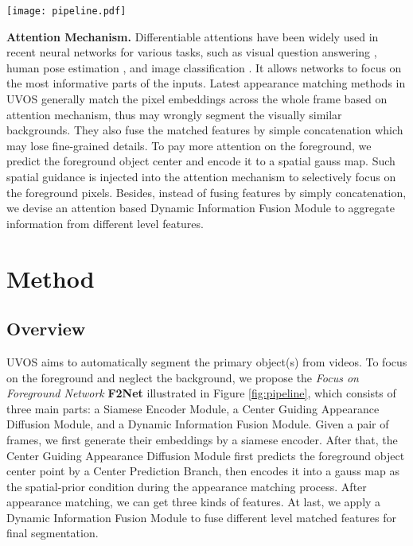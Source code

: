 \documentclass[letterpaper]{article} \usepackage{aaai20}  \usepackage{times}  \usepackage{helvet} \usepackage{courier}  \usepackage[hyphens]{url}  \usepackage{graphicx} \urlstyle{rm} \def\UrlFont{\rm}  \usepackage{graphicx}  \frenchspacing  \setlength{\pdfpagewidth}{8.5in}  \setlength{\pdfpageheight}{11in}  \usepackage{amssymb}
\begin{document}
\begin{figure*}[t!]
\centering
\texttt{[image: pipeline.pdf]}
\caption{Overall pipeline of the proposed network architecture. A pair of frames is first fed into a siamese encoder to obtain the feature representations. After that, we develop a Center Guiding Appearance Diffusion Module to first predict the center point of the foreground object in current frame, and then generate a gauss map as spatial guidance prior for the following up appearance matching procedure. At last, we devise a Dynamic Information Fusion Module to aggregate different level features for foreground object segmentation.}
\label{fig:pipeline}
\vspace{-10pt}
\end{figure*}

\noindent \textbf{Attention Mechanism.}
Differentiable attentions have been widely used in recent neural networks for various tasks, such as visual question answering \cite{lu2016hierarchical}, human pose estimation \cite{chu2017multi,su2019multi}, and image classification \cite{hu2018squeeze,li2019selective}. It allows networks to focus on the most informative parts of the inputs. Latest appearance matching methods in UVOS \cite{wang2019zero,yang2019anchor,lu2019see} generally match the pixel embeddings across the whole frame based on attention mechanism, thus may wrongly segment the visually similar backgrounds. They also fuse the matched features by simple concatenation which may lose fine-grained details. To pay more attention on the foreground, we predict the foreground object center and encode it to a spatial gauss map. Such spatial guidance is injected into the attention mechanism to selectively focus on the foreground pixels. Besides, instead of fusing features by simply concatenation, we devise an attention based Dynamic Information Fusion Module to aggregate information from different level features.

\section{Method}
\subsection{Overview}
UVOS aims to automatically segment the primary object(s) from videos. To focus on the foreground and neglect the background, we propose the \textit{Focus on Foreground Network} \textbf{F2Net} illustrated in Figure \ref{fig:pipeline}, which consists of three main parts: a Siamese Encoder Module, a Center Guiding Appearance Diffusion Module, and a Dynamic Information Fusion Module.
Given a pair of frames, we first generate their embeddings by a siamese encoder. After that, the Center Guiding Appearance Diffusion Module first predicts the foreground object center point by a Center Prediction Branch, then encodes it into a gauss map as the spatial-prior condition during the appearance matching process. After appearance matching, we can get three kinds of features. At last, we apply a Dynamic Information Fusion Module to fuse different level matched features for final segmentation.
\end{document}
